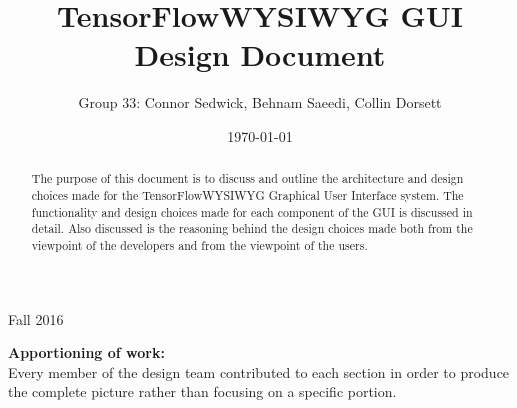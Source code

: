 \documentclass[journal,10pt,onecolumn,compsoc]{IEEEtran} \usepackage[margin=1.0in]{geometry} \usepackage{pdfpages}
\title{TensorFlow\texttrademark WYSIWYG GUI Design Document}
\author{Group 33: Connor Sedwick, Behnam Saeedi, Collin Dorsett}
\date{\today}
\begin{document}
\maketitle
\begin{centering}
Fall 2016
\begin{abstract}
The purpose of this document is to discuss and outline the architecture and design choices made for the TensorFlow\texttrademark WYSIWYG Graphical User Interface system. 
The functionality and design choices made for  each component of the GUI is discussed in detail.
Also discussed is the reasoning behind the design choices made both from the viewpoint of the developers and from the viewpoint of the users.
\end{abstract}
\end{centering}
\newpage
\tableofcontents
\noindent\textbf{Apportioning of work:}\\
\noindent Every member of the design team contributed to each section in order to produce the complete picture rather than focusing on a specific portion.\\
\end{document}
